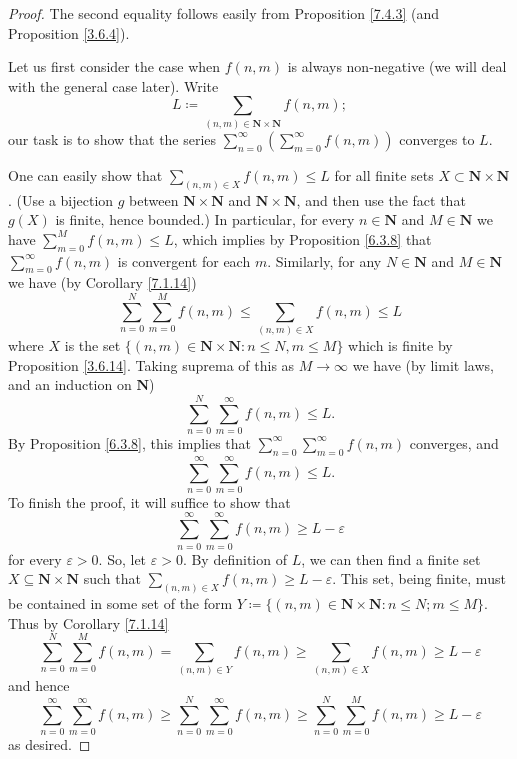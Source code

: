 \begin{proof}
The second equality follows easily from Proposition \ref{7.4.3} (and Proposition \ref{3.6.4}).

Let us first consider the case when \(f(n, m)\) is always non-negative (we will deal with the general case later).
Write
\[
    L \coloneqq \sum_{(n, m) \in \mathbf{N} \times \mathbf{N}} f(n, m);
\]
our task is to show that the series \(\sum_{n = 0}^\infty (\sum_{m = 0}^\infty f(n, m))\) converges to \(L\).

One can easily show that \(\sum_{(n, m) \in X} f(n, m) \leq L\) for all finite sets \(X \subset \mathbf{N} \times \mathbf{N}\).
(Use a bijection \(g\) between \(\mathbf{N} \times \mathbf{N}\) and \(\mathbf{N} \times \mathbf{N}\), and then use the fact that \(g(X)\) is finite, hence bounded.)
In particular, for every \(n \in \mathbf{N}\) and \(M \in \mathbf{N}\) we have \(\sum_{m = 0}^M f(n, m) \leq L\), which implies by Proposition \ref{6.3.8} that \(\sum_{m = 0}^\infty f(n, m)\) is convergent for each \(m\).
Similarly, for any \(N \in \mathbf{N}\) and \(M \in \mathbf{N}\) we have (by Corollary \ref{7.1.14})
\[
    \sum_{n = 0}^N \sum_{m = 0}^M f(n, m) \leq \sum_{(n, m) \in X} f(n, m) \leq L
\]
where \(X\) is the set \(\{(n,m) \in \mathbf{N} \times \mathbf{N} : n \leq N, m \leq M\}\) which is finite by Proposition \ref{3.6.14}.
Taking suprema of this as \(M \to \infty\) we have (by limit laws, and an induction on \(\mathbf{N}\))
\[
    \sum_{n = 0}^N \sum_{m = 0}^\infty f(n, m) \leq L.
\]
By Proposition \ref{6.3.8}, this implies that \(\sum_{n = 0}^\infty \sum_{m = 0}^\infty f(n, m)\) converges, and
\[
    \sum_{n = 0}^\infty \sum_{m = 0}^\infty f(n, m) \leq L.
\]
To finish the proof, it will suffice to show that
\[
    \sum_{n = 0}^\infty \sum_{m = 0}^\infty f(n, m) \geq L - \varepsilon
\]
for every \(\varepsilon > 0\).
So, let \(\varepsilon > 0\).
By definition of \(L\), we can then find a finite set \(X \subseteq \mathbf{N} \times \mathbf{N}\) such that \(\sum_{(n, m) \in X} f(n, m) \geq L - \varepsilon\).
This set, being finite, must be contained in some set of the form \(Y \coloneqq \{(n,m) \in \mathbf{N} \times \mathbf{N} : n \leq N; m \leq M \}\).
Thus by Corollary \ref{7.1.14}
\[
    \sum_{n = 0}^N \sum_{m = 0}^M f(n, m) = \sum_{(n, m) \in Y} f(n, m) \geq \sum_{(n, m) \in X} f(n, m) \geq L - \varepsilon
\]
and hence
\[
    \sum_{n = 0}^\infty \sum_{m = 0}^\infty f(n, m) \geq \sum_{n = 0}^N \sum_{m = 0}^\infty f(n, m) \geq \sum_{n = 0}^N \sum_{m = 0}^M f(n, m) \geq L - \varepsilon
\]
as desired.


\end{proof}
